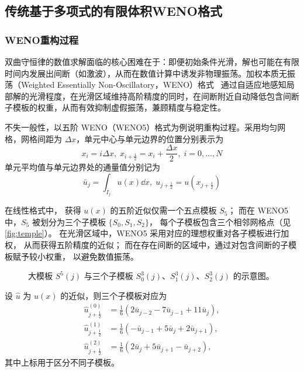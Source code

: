 \documentclass[12pt,a4paper]{article}
\numberwithin{equation}{section}    %
\begin{document}
\subsection{传统基于多项式的有限体积WENO格式}
\subsubsection{WENO重构过程}
双曲守恒律的数值求解面临的核心困难在于：即便初始条件光滑，解也可能在有限时间内发展出间断（如激波），从而在数值计算中诱发非物理振荡。加权本质无振荡（Weighted Essentially Non-Oscillatory，WENO）格式~\cite{JIANG1996} 通过自适应地感知局部解的光滑程度，在光滑区域维持高阶精度的同时，在间断附近自动降低包含间断子模板的权重，从而有效抑制虚假振荡，兼顾精度与稳定性。

不失一般性，以五阶 WENO（WENO5）格式为例说明重构过程。采用均匀网格，网格间距为 $\Delta x$，单元中心与单元边界的位置分别表示为
\begin{equation}
    x_i = i\Delta x,\; x_{i+\frac{1}{2}} = x_i + \frac{\Delta x}{2},\; i=0,\dots,N
\end{equation}
单元平均值与单元边界处的通量值分别记为
\begin{equation}
    \bar{u}_j = \int_{I_j} u(x) \dd x,\; u_{j+\frac{1}{2}} = u(x_{j+\frac{1}{2}})
\end{equation}

在线性格式中，
获得 $u(x)$ 的五阶近似仅需一个五点模板 $S_5$；
而在 WENO5 中，$S_5$ 被划分为三个子模板 $\{S_0,S_1,S_2\}$，
每个子模板包含三个相邻网格点（见\autoref{fig:temple}）。
在光滑区域中，WENO5 采用对应的理想权重对各子模板进行加权，
从而获得五阶精度的近似；
而在存在间断的区域中，通过对包含间断的子模板赋予较小权重，
以避免数值振荡。

\begin{figure}[!htbp]
    \centering
    
    \caption{大模板 $S^5(j)$ 与三个子模板 $S^3_0(j)$、$S^3_1(j)$、$S^3_2(j)$ 的示意图。}
    \label{fig:temple}
\end{figure}


设 $\hat{u}$ 为 $u(x)$ 的近似，则三个子模板对应为
\begin{equation}
\begin{aligned}
\hat{u}^{(0)}_{j+\frac{1}{2}} &= \frac{1}{6}\left(2\bar{u}_{j-2}-7\bar{u}_{j-1}+11\bar{u}_j\right),\\
\hat{u}^{(1)}_{j+\frac{1}{2}} &= \frac{1}{6}\left(-\bar{u}_{j-1}+5\bar{u}_j+2\bar{u}_{j+1}\right),\\
\hat{u}^{(2)}_{j+\frac{1}{2}} &= \frac{1}{6}\left(2\bar{u}_j+5\bar{u}_{j+1}-\bar{u}_{j+2}\right),
\end{aligned}
\end{equation}
其中上标用于区分不同子模板。
\end{document}
